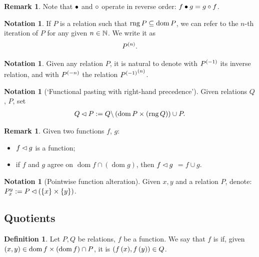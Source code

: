 \documentclass[oneside
]
{article}
\theoremstyle{plain}
\theoremstyle{definition}
\newtheorem{Def}[Cor]{Definition}
\newtheorem{Rem}[Cor]{Remark}
\newtheorem{Not}[Cor]{Notation}
\DeclareMathOperator{\rng}{rng}
\DeclareMathOperator{\dom}{dom}
\begin{document}
\begin{Rem}
Note that $\bullet$ and $\circ$ operate in reverse order: $ f \bullet g = g \circ f$. 
\end{Rem}

\begin{Not}
If $P$ is a relation such that $\rng P \C \dom P $, we can refer to the $n$-th iteration of $P$ for any given $n \in \mathbb{N}$.
We write it as
\begin{align*}
{P}^{\left({n} \right)}.
\end{align*}
\end{Not}
\begin{Not}
Given any relation $P$, it is natural to denote with ${P}^{\left({-1} \right)}$ its inverse relation, and with ${P}^{\left({-n} \right)}$ the relation $ {{P}^{\left({-1} \right)}}^{\left({n} \right)}$.
\end{Not}

\begin{Not}[`Functional pasting with right-hand precedence{}']
\label{RefDefPaste}
Given relations $Q$, $P$, set
\begin{align*}
Q \paste P := Q \sdiff \left( \dom P \cartprod \left( \rng Q \right) \right) \cup P.
\end{align*}
\end{Not}

\begin{Rem}
Given two functions $f$, $g$: 
\begin{itemize}
\item
$f \lhd g$ is a function;
\item
if $f$ and $g$ agree on $\dom f \cap \left( \dom g \right)$, then $ f \lhd g$ $= f \cup g $.
\end{itemize}
\end{Rem}

\begin{Not}[Pointwise function alteration]
Given $x,y$ and a relation $P$, denote:
${P}_{x}^{y} := P \lhd \left( \left\{ x \right\}\times \left\{ y \right\} \right)$. 
\end{Not}

\subsection{Quotients}
\label{RefSectQuotients}
\begin{Def}
\label{RefDefCompatible}
Let $P, Q$ be relations, $f$ be a function. We say that $f$ is  if, given  
$\pair{x}{y} \in \dom f \cartprod \left( \dom f \right) \cap P$, it is  
$\left( {f\left( x \right)}, {f \left( y \right)} \right) \in Q$.
\end{Def}
\end{document}
